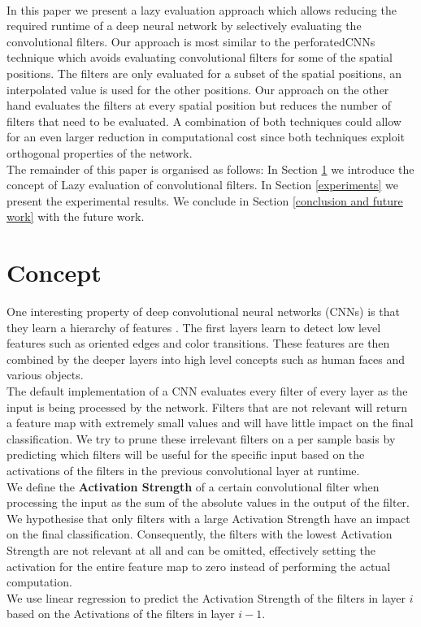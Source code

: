 \documentclass{article}
\begin{document}
\\
\newline
In this paper we present a lazy evaluation approach which allows reducing the required runtime of a deep neural network by selectively evaluating the convolutional filters. Our approach is most similar to the perforatedCNNs technique \cite{figurnov2015perforatedcnns} which avoids evaluating convolutional filters for some of the spatial positions. The filters are only evaluated for  a subset of the spatial positions, an interpolated value is used for the other positions. Our approach on the other hand evaluates the filters at every spatial position but reduces the number of filters that need to be evaluated. A combination of both techniques could allow for an even larger reduction in computational cost since both techniques exploit orthogonal properties of the network.
\\
\newline
The remainder of this paper is organised as follows: In Section \ref{concept} we introduce the concept of Lazy evaluation of convolutional filters. In Section \ref{experiments} we present the experimental results. We conclude in Section \ref{conclusion and future work} with the future work.


\section{Concept}
\label{concept}
One interesting property of deep convolutional neural networks (CNNs) is that they learn a hierarchy of features \cite{le2013building,razavian2014cnn, yosinski2014transferable}. The first layers learn to detect low level features such as oriented edges and color transitions. These features are then combined by the deeper layers into high level concepts such as human faces and various objects. 
\\
\newline
The default implementation of a CNN evaluates every filter of every layer as the input is being processed by the network. Filters that are not relevant will return a feature map with extremely small values and will have little impact on the final classification. We try to prune these irrelevant filters on a per sample basis by predicting which filters will be useful for the specific input based on the activations of the filters in the previous convolutional layer at runtime.
\\
\newline
We define the \textbf{Activation Strength} of a certain convolutional filter when processing the input as the sum of the absolute values in the output of the filter. We hypothesise that only filters with a large Activation Strength have an impact on the final classification. Consequently, the filters with the lowest Activation Strength are not relevant at all and can be omitted, effectively setting the activation for the entire feature map to zero instead of performing the actual computation.
\\
\newline
We use linear regression to predict the Activation Strength of the filters in layer $i$ based on the Activations of the filters in layer $i-1$.
\end{document}
